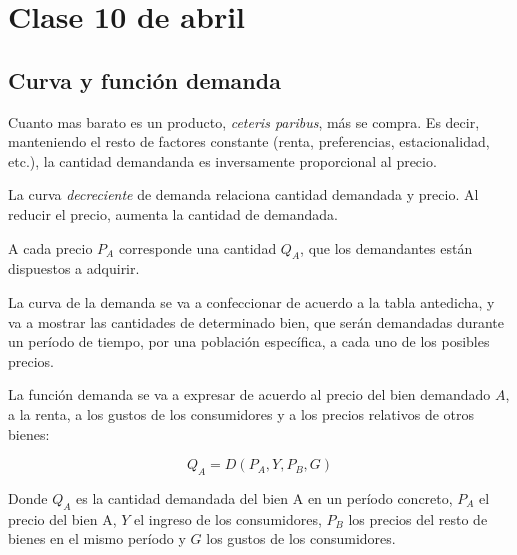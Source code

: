 \section{Clase 10 de abril}

\subsection{Curva y función demanda}

Cuanto mas barato es un producto, 
\textit{ceteris paribus},
más se compra.
Es decir,
manteniendo el resto de factores constante 
(renta, preferencias, estacionalidad, etc.),
la cantidad demandanda es inversamente proporcional al precio.

La curva \textit{decreciente} de demanda relaciona cantidad demandada y precio.
Al reducir el precio,
aumenta la cantidad de demandada.

A cada precio \(P_A\) corresponde una cantidad \(Q_A\),
que los demandantes están dispuestos a adquirir.

La curva de la demanda se va a confeccionar de acuerdo a la tabla antedicha,
y va a mostrar las cantidades de determinado bien,
que serán demandadas durante un período de tiempo,
por una población específica,
a cada uno de los posibles precios.

La función demanda se va a expresar de acuerdo al precio del bien demandado \(A\),
a la renta, 
a los gustos de los consumidores 
y a los precios relativos de otros bienes:

\begin{equation*}
    Q_A = D(P_A, Y, P_B, G)
\end{equation*}

Donde \(Q_A\) es la cantidad demandada del bien A en un período concreto,
\(P_A\) el precio del bien A,
\(Y\) el ingreso de los consumidores,
\(P_B\) los precios del resto de bienes en el mismo período
y \(G\) los gustos de los consumidores.

\begin{center}
\end{center}

